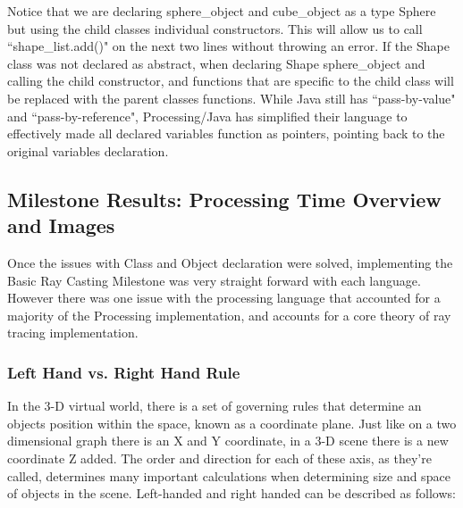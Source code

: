 \doublespacing
Notice that we are declaring sphere\_object and cube\_object as a type Sphere but using the child classes individual constructors.  This will allow us to call ``shape\_list.add()" on the next two lines without throwing an error.  If the Shape class was not declared as abstract, when declaring Shape sphere\_object and calling the child constructor, and functions that are specific to the child class will be replaced with the parent classes functions.  While Java still has ``pass-by-value" and ``pass-by-reference", Processing/Java has simplified their language to effectively made all declared variables function as pointers, pointing back to the original variables declaration.

\subsection{Milestone Results: Processing Time Overview and Images}
Once the issues with Class and Object declaration were solved, implementing the Basic Ray Casting Milestone was very straight forward with each language.  However there was one issue with the processing language that accounted for a majority of the Processing implementation, and accounts for a core theory of ray tracing implementation.
\subsubsection{Left Hand vs. Right Hand Rule}
In the 3-D virtual world, there is a set of governing rules that determine an objects position within the space, known as a coordinate plane.  Just like on a two dimensional graph there is an X and Y coordinate, in a 3-D scene there is a new coordinate Z added.  The order and direction for each of these axis, as they're called, determines many important calculations when determining size and space of objects in the scene.  Left-handed and right handed can be described as follows:

